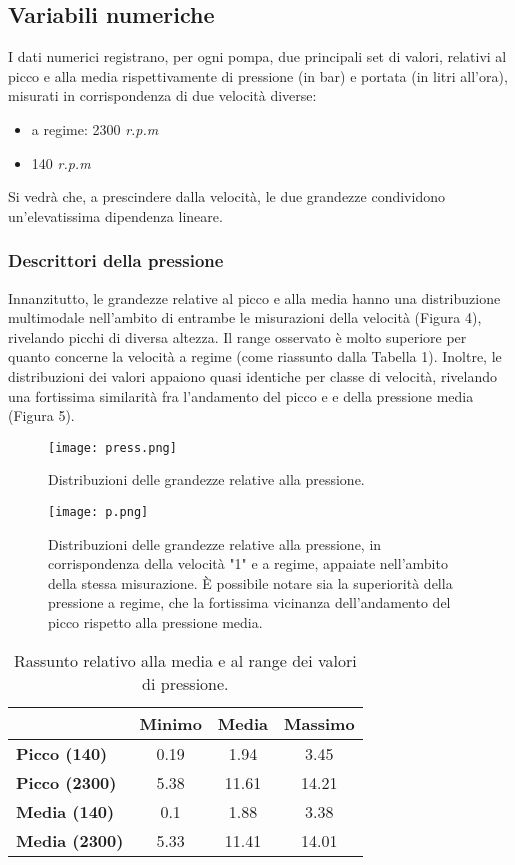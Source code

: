 \documentclass[fleqn,10pt]{SelfArx} %
\begin{document}
\subsection{Variabili numeriche}
I dati numerici registrano, per ogni pompa, due principali set di valori, relativi al picco e alla media rispettivamente di pressione (in bar) e portata (in litri all'ora), misurati in corrispondenza di due velocità diverse:
\begin{itemize}
    \item a regime: 2300 \textit{r.p.m}
    \item 140 \textit{r.p.m}
\end{itemize}
Si vedrà che, a prescindere dalla velocità, le due grandezze condividono un'elevatissima dipendenza lineare.
\subsubsection{Descrittori della pressione}
Innanzitutto, le grandezze relative al picco e alla media hanno una distribuzione multimodale nell'ambito di entrambe le misurazioni della velocità (Figura 4), rivelando picchi di diversa altezza. Il range osservato è molto superiore per quanto concerne la velocità a regime (come riassunto dalla Tabella 1). Inoltre, le distribuzioni dei valori appaiono quasi identiche per classe di velocità, rivelando una fortissima similarità fra l'andamento del picco e e della pressione media (Figura 5).
\begin{figure}[h]
    \centering
    \texttt{[image: press.png]}
    \label{fig:em}
    \caption{Distribuzioni delle grandezze relative alla pressione.}
\end{figure}
\begin{figure}[h]
    \centering
    \texttt{[image: p.png]}
    \label{fig:em}
    \caption{Distribuzioni delle grandezze relative alla pressione, in corrispondenza della velocità "1" e a regime, appaiate nell'ambito della stessa misurazione. È possibile notare sia la superiorità della pressione a regime, che la fortissima vicinanza dell'andamento del picco rispetto alla pressione media.}
\end{figure}
{\begin{table}[h]
\centering
\begin{tabular}[t]{lccc}
\toprule
&Minimo&Media&Massimo\\
\midrule
\textbf{Picco (140)}&0.19&1.94&3.45\\
\textbf{Picco (2300)}&5.38&11.61&14.21\\
\textbf{Media (140)}&0.1&1.88&3.38\\
\textbf{Media (2300)}&5.33&11.41&14.01\\
\bottomrule
\end{tabular}
\caption{Rassunto relativo alla media e al range dei valori di pressione.}
\end{table}}
\end{document}
